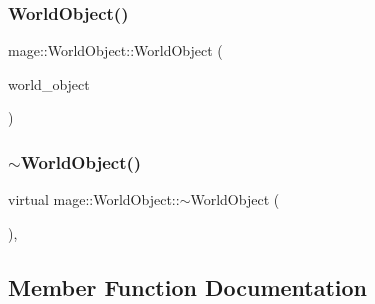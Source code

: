 \hypertarget{classmage_1_1_world_object_af8e2a82bd8a59d1ec8776e27ed5900cd}{}\label{classmage_1_1_world_object_af8e2a82bd8a59d1ec8776e27ed5900cd} 
\subsubsection{\texorpdfstring{World\+Object()}{WorldObject()}\hspace{0.1cm}{\footnotesize\ttfamily [3/3]}}
{\footnotesize\ttfamily mage\+::\+World\+Object\+::\+World\+Object (\begin{DoxyParamCaption}\item[{\hyperlink{classmage_1_1_world_object}{World\+Object} \&\&}]{world\+\_\+object }\end{DoxyParamCaption})\hspace{0.3cm}{\ttfamily [default]}}

\hypertarget{classmage_1_1_world_object_a6ae28ad98832c1e97b681816755a79f2}{}\label{classmage_1_1_world_object_a6ae28ad98832c1e97b681816755a79f2} 
\subsubsection{\texorpdfstring{$\sim$\+World\+Object()}{~WorldObject()}}
{\footnotesize\ttfamily virtual mage\+::\+World\+Object\+::$\sim$\+World\+Object (\begin{DoxyParamCaption}{ }\end{DoxyParamCaption})\hspace{0.3cm}{\ttfamily [virtual]}, {\ttfamily [default]}}



\subsection{Member Function Documentation}
\hypertarget{classmage_1_1_world_object_a5c66de01e9b83c4c1fa6cd64e17443ee}{}\label{classmage_1_1_world_object_a5c66de01e9b83c4c1fa6cd64e17443ee} 
